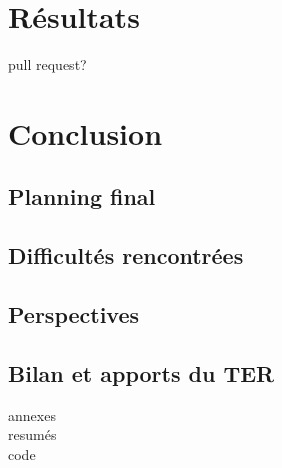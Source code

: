 \documentclass[12pt,a4paper]{report}
\begin{document}
\chapter{Résultats}
pull request?

\chapter{Conclusion}
\section{Planning final}

\section{Difficultés rencontrées}

\section{Perspectives}

\section{Bilan et apports du TER}
annexes\\
resumés\\
code



\end{document}
